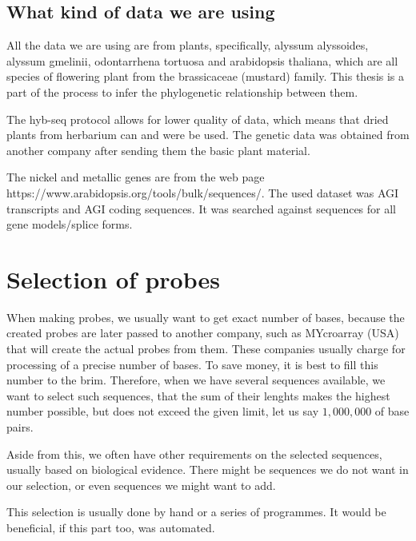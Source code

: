 
\subsection{What kind of data we are using}
All the data we are using are from plants, specifically, alyssum alyssoides, alyssum gmelinii, odontarrhena tortuosa and arabidopsis thaliana, 
which are all species of flowering plant from the brassicaceae (mustard) family. This thesis is a part of the process to infer the phylogenetic 
relationship between them. 

The hyb-seq protocol allows for lower quality of data, which means that dried plants from herbarium can and were be used. The genetic data was obtained from 
another company after sending them the basic plant material. 

The nickel and metallic genes are from the web page https://www.arabidopsis.org/tools/bulk/sequences/. The used dataset was AGI transcripts and AGI coding sequences. 
It was searched against sequences for all gene models/splice forms. 

\section{Selection of probes}

When making probes, we usually want to get exact number of bases, because the created probes are later passed to another 
company, such as MYcroarray (USA) \cite{mycroarray} that will create the actual probes from them. These companies 
usually charge for processing of a precise number of bases. To save money, it is best to fill this number to the brim. 
Therefore, when we have several sequences available, we want to select such sequences, that the sum of their lenghts makes the 
highest number possible, but does not exceed the given limit, let us say $1,000,000$ of base pairs. 

Aside from this, we often have other requirements on the selected sequences, usually based on biological evidence. There might be 
sequences we do not want in our selection, or even sequences we might want to add. 

This selection is usually done by hand or a series of programmes. It would be beneficial, if this part too, was automated. 


